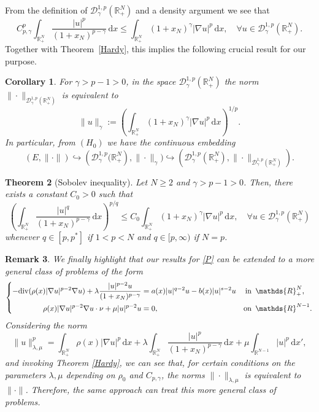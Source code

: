\documentclass[12pt,reqno]{amsart}
\newtheorem{theorem}{Theorem}[section]
\newtheorem{corollary}[theorem]{Corollary}
\newtheorem{remark}[theorem]{Remark}
\begin{document}
From the definition of $\mathcal{D}_\gamma^{1, p}(\mathds{R}^N_+)$ and a density argument we see that  
\begin{equation}\label{hardy Fraca}
			 C_{p,\gamma}^p \int_{\mathds{R}_{+}^N}\frac{|u|^p}{(1+x_N)^{p-\gamma}}\, \mathrm{d}  x  
   \leq \int_{\mathds{R}_{+}^N}(1+x_N)^\gamma |\nabla u|^p \, \mathrm{d} x , \quad \forall u\in \mathcal{D}_\gamma^{1, p}(\mathds{R}^N_+).
		\end{equation}
Together with Theorem~\ref{Hardy}, this implies the following crucial result for our purpose.
\begin{corollary} For $\gamma>p-1>0$, in the space $\mathcal{D}_\gamma^{1, p}(\mathds{R}^N_+)$ the norm $\|\cdot\|_{\mathcal{D}_\gamma^{1, p}(\mathds{R}^N_+)}$ is equivalent to
		$$
		\|u\|_\gamma:=\left(\int_{\mathds{R}^N_+}(1+x_N)^\gamma|\nabla u|^p\, \mathrm{d} x\right)^{1/p}.
		$$
  In particular, from $(H_0)$ we have the continuous embedding 
  $$
  \left(E,\|\cdot\|\right)\hookrightarrow \left(\mathcal{D}_\gamma^{1, p}(\mathds{R}^N_+\right),\|\cdot\|_\gamma)\hookrightarrow (\mathcal{D}_\gamma^{1, p}(\mathds{R}^N_+),\|\cdot\|_{\mathcal{D}_\gamma^{1, p}(\mathds{R}^N_+)}).
  $$
	\end{corollary}
	
	\begin{theorem}[Sobolev inequality]\label{Sobolev} Let $N\ge2$ and $\gamma>p-1>0$. Then, there exists a constant $C_0>0$ such that  
		$$
			\left(\int_{\mathds{R}^{N}_+}\frac{|u|^q}{(1+x_N)^{p-\gamma}}\, \mathrm{d} x\right)^{p/q} \leq C_0 \int_{\mathds{R}^{N}_+}(1+x_N)^{\gamma}|\nabla u|^p\, \mathrm{d} x,\quad \forall u \in \mathcal{D}_\gamma^{1, p}(\mathds{R}^N_+)
		$$
		whenever $q\in[p,p^*]$ if $1<p<N$ and $q\in[p,\infty)$ if $N=p$.
	\end{theorem}
\begin{remark} We finally highlight that our results for \eqref{P} can be extended to a more general class of problems of the form
$$
			\left\lbrace
			\begin{aligned}
				-{\rm{div}}(\rho(x)|\nabla u|^{p-2}\nabla u ) +\lambda\frac{|u|^{p-2}u}{(1+x_N)^{p-\gamma}}&=a(x)|u|^{q-2}u-b(x)|u|^{s-2}u&\mbox{in }&\,\mathds{R}^N_+,
				\vspace{0.2cm}\\
				\rho(x)|\nabla u|^{p-2}\nabla u\cdot\nu+\mu |u|^{p-2}u&=0,&\mbox{on }&\,\mathds{R}^{N-1}.
			\end{aligned}
			\right.
$$
Considering the norm 
$$
		\|u\|^p_{\lambda, \mu} = \int_{\mathds{R}^{N}_+}\rho(x)|\nabla u|^p\, \mathrm{d} x+\lambda\int_{\mathds{R}^{N}_+}\frac{|u|^p}{(1+x_N)^{p-\gamma}}\, \mathrm{d} x+\mu \int_{\mathds{R}^{N-1}}|u|^p\, \mathrm{d} x',
  $$
and invoking Theorem \ref{Hardy}, we can see that, for certain conditions on the parameters $\lambda,\mu$  depending on $\rho_0$ and $C_{p,\gamma}$, the norms $\|\cdot\|_{\lambda,\mu}$ is equivalent to $\|\cdot\|$.
Therefore, the same approach can treat this more general class of problems. 
\end{remark}
\end{document}
